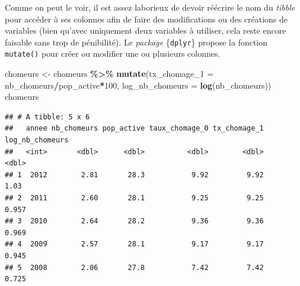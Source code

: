 \documentclass[
  11pt,
]{book}
\newenvironment{Shaded}{\begin{snugshade}}{\end{snugshade}}
\newcommand{\CommentTok}[1]{\textcolor[rgb]{0.56,0.35,0.01}{\textit{#1}}}
\newcommand{\DataTypeTok}[1]{\textcolor[rgb]{0.13,0.29,0.53}{#1}}
\newcommand{\DecValTok}[1]{\textcolor[rgb]{0.00,0.00,0.81}{#1}}
\newcommand{\FloatTok}[1]{\textcolor[rgb]{0.00,0.00,0.81}{#1}}
\newcommand{\KeywordTok}[1]{\textcolor[rgb]{0.13,0.29,0.53}{\textbf{#1}}}
\newcommand{\NormalTok}[1]{#1}
\newcommand{\OperatorTok}[1]{\textcolor[rgb]{0.81,0.36,0.00}{\textbf{#1}}}
\newcommand{\StringTok}[1]{\textcolor[rgb]{0.31,0.60,0.02}{#1}}
\numberwithin{equation}{section}
\numberwithin{countremarque}{section}
\begin{document}
\begin{Shaded}
\end{Shaded}

Comme on peut le voir, il est assez laborieux de devoir réécrire le nom du \emph{tibble} pour accéder à ses colonnes afin de faire des modifications ou des créations de variables (bien qu'avec uniquement deux variables à utiliser, cela reste encore faisable sans trop de pénibilité). Le \emph{package} \{\texttt{dplyr}\} propose la fonction \texttt{mutate()} pour créer ou modifier une ou plusieurs colonnes.

\begin{Shaded}
\begin{Highlighting}[]
\NormalTok{chomeurs \textless{}{-}}\StringTok{ }
\StringTok{  }\NormalTok{chomeurs }\OperatorTok{\%\textgreater{}\%}\StringTok{ }
\StringTok{  }\KeywordTok{mutate}\NormalTok{(}\DataTypeTok{tx\_chomage\_1 =}\NormalTok{ nb\_chomeurs}\OperatorTok{/}\NormalTok{pop\_active}\OperatorTok{*}\DecValTok{100}\NormalTok{,}
         \DataTypeTok{log\_nb\_chomeurs =} \KeywordTok{log}\NormalTok{(nb\_chomeurs))}
\NormalTok{chomeurs}
\end{Highlighting}
\end{Shaded}

\begin{lstlisting}
## # A tibble: 5 x 6
##   annee nb_chomeurs pop_active taux_chomage_0 tx_chomage_1 log_nb_chomeurs
##   <int>       <dbl>      <dbl>          <dbl>        <dbl>           <dbl>
## 1  2012        2.81       28.3           9.92         9.92           1.03 
## 2  2011        2.60       28.1           9.25         9.25           0.957
## 3  2010        2.64       28.2           9.36         9.36           0.969
## 4  2009        2.57       28.1           9.17         9.17           0.945
## 5  2008        2.06       27.8           7.42         7.42           0.725
\end{lstlisting}
\end{document}
